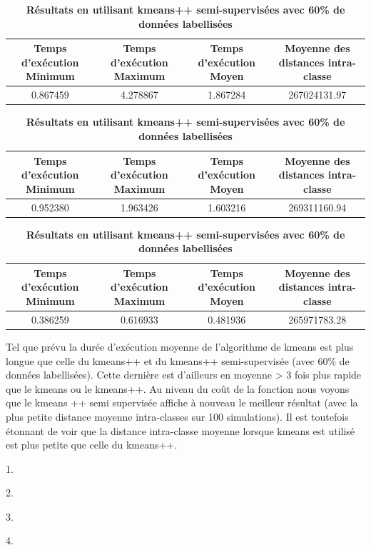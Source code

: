 \documentclass[ ]{article}
\begin{document}
\begin{table}[ht]
\centering

\vspace{10 mm}
\caption{\textbf{Résultats en utilisant kmeans}} 

\begin{tabular}{c|c|c|c}
\hline
\rowcolor{Gray}
Temps d'exécution Minimum & Temps d'exécution Maximum & Temps d'exécution Moyen & Moyenne des distances intra-classe \\
\hline
0.867459&4.278867& 1.867284& \cellcolor{LightCyan}267024131.97\\

\end{tabular}

\centering

\vspace{10 mm}
\caption{\textbf{Résultats en utilisant kmeans++}} 

\begin{tabular}{c|c|c|c}
\hline
\rowcolor{Gray}
Temps d'exécution Minimum & Temps d'exécution Maximum & Temps d'exécution Moyen & Moyenne des distances intra-classe \\
\hline
0.952380&1.963426& 1.603216& \cellcolor{LightCyan}269311160.94\\

\end{tabular}

\centering

\vspace{10 mm}
\caption{\textbf{Résultats en utilisant kmeans++ semi-supervisées avec 60\% de données labellisées}} 

\begin{tabular}{c|c|c|c}
\hline
\rowcolor{Gray}
Temps d'exécution Minimum & Temps d'exécution Maximum & Temps d'exécution Moyen & Moyenne des distances intra-classe \\
\hline
0.386259&0.616933& 0.481936& \cellcolor{LightCyan}265971783.28\\
\end{tabular}

\end{table}

\vspace{10 mm}


\noindent 
Tel que prévu la durée d'exécution moyenne de l'algorithme de kmeans est plus longue que celle du kmeans++ et du kmeans++ semi-supervisée (avec 60\% de données labellisées). Cette dernière est d'ailleurs en moyenne > 3 fois plus rapide que le kmeans ou le kmeans++. Au niveau du coût de la fonction nous voyons que le kmeans ++ semi supervisée affiche à nouveau le meilleur résultat (avec la plus petite distance moyenne intra-classes sur 100 simulations). Il est toutefois étonnant de voir que la distance intra-classe moyenne lorsque kmeans est utilisé est plus petite que celle du kmeans++. 


\noindent






\vspace{5mm}
\noindent

\begin{description}
  \item 1. 
  \item 2. 
  \item 3. 
  \item 4.
\end{description}
\end{document}
